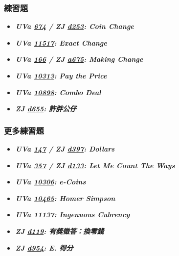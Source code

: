 \subsubsection*{練習題}
\begin{itemize}[label={\Checkmark}]
\item \textbf{\textit{UVa \href{http://uva.onlinejudge.org/external/6/674.html}{674} / ZJ \href{http://zerojudge.tw/ShowProblem?problemid=d253}{d253}: Coin Change}}\\

\item \textbf{\textit{UVa \href{http://uva.onlinejudge.org/external/115/11517.html}{11517}: Exact Change}}\\

\item \textbf{\textit{UVa \href{http://uva.onlinejudge.org/external/1/166.html}{166} / ZJ \href{http://zerojudge.tw/ShowProblem?problemid=a675}{a675}: Making Change}}\\

\item \textbf{\textit{UVa \href{http://uva.onlinejudge.org/external/103/10313.html}{10313}: Pay the Price}}\\

\item \textbf{\textit{UVa \href{http://uva.onlinejudge.org/external/108/10898.html}{10898}: Combo Deal}}\\

\item \textbf{\textit{ZJ \href{http://zerojudge.tw/ShowProblem?problemid=d655}{d655}: 許胖公仔}}\\

\end{itemize}
\subsubsection*{更多練習題}
\begin{itemize}[label={\PencilLeftDown}]
\item \textbf{\textit{UVa \href{http://uva.onlinejudge.org/external/1/147.html}{147} / ZJ \href{http://zerojudge.tw/ShowProblem?problemid=d397}{d397}: Dollars}}
\item \textbf{\textit{UVa \href{http://uva.onlinejudge.org/external/3/357.html}{357} / ZJ \href{http://zerojudge.tw/ShowProblem?problemid=d133}{d133}: Let Me Count The Ways}}
\item \textbf{\textit{UVa \href{http://uva.onlinejudge.org/external/103/10306.html}{10306}: e-Coins}}
\item \textbf{\textit{UVa \href{http://uva.onlinejudge.org/external/104/10465.html}{10465}: Homer Simpson}}
\item \textbf{\textit{UVa \href{http://uva.onlinejudge.org/external/111/11137.html}{11137}: Ingenuous Cubrency}}
\item \textbf{\textit{ZJ \href{http://zerojudge.tw/ShowProblem?problemid=d119}{d119}: 有獎徵答：換零錢}}
\item \textbf{\textit{ZJ \href{http://zerojudge.tw/ShowProblem?problemid=d954}{d954}: E. 得分}}
\end{itemize}